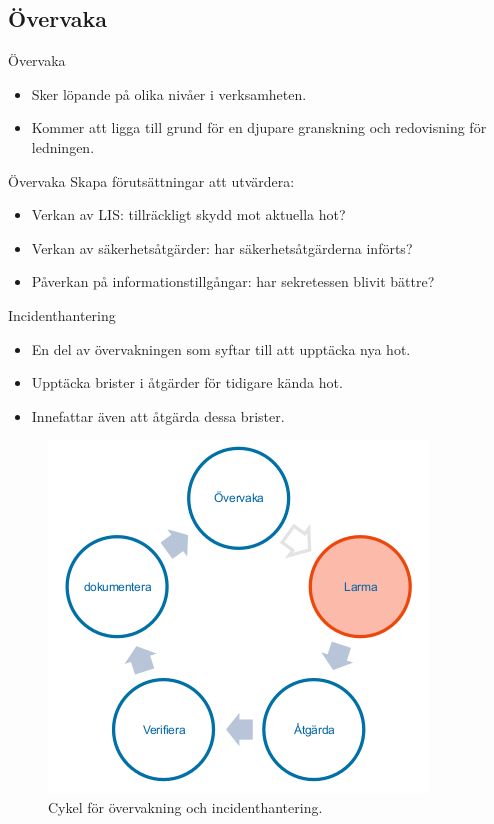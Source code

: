 \documentclass{beamer}
\begin{document}
\subsection{Övervaka}
\begin{frame}{Övervaka}
  \begin{itemize}
    \item Sker löpande på olika nivåer i verksamheten.
    \item Kommer att ligga till grund för en djupare granskning och redovisning 
      för ledningen.
  \end{itemize}
\end{frame}
\begin{frame}{Övervaka}
  Skapa förutsättningar att utvärdera:
  \begin{itemize}
    \item Verkan av LIS\@: tillräckligt skydd mot aktuella hot?
    \item Verkan av säkerhetsåtgärder: har säkerhetsåtgärderna införts?
    \item Påverkan på informationstillgångar: har sekretessen blivit bättre?
  \end{itemize}
\end{frame}
\begin{frame}{Incidenthantering}
  \begin{itemize}
    \item En del av övervakningen som syftar till att upptäcka nya hot.
    \item Upptäcka brister i åtgärder för tidigare kända hot.
    \item Innefattar även att åtgärda dessa brister.
  \end{itemize}
  \begin{figure}
    \includegraphics[height=0.4\textheight]{overvakning.png}
    \caption{Cykel för övervakning och incidenthantering.}
  \end{figure}
\end{frame}
\end{document}
